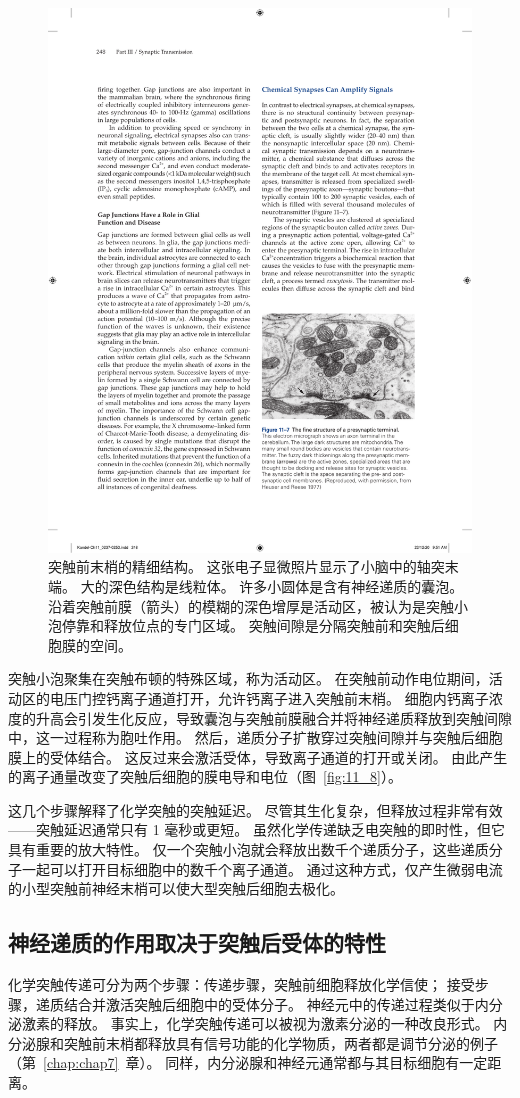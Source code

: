 \begin{figure}[htbp]
	\centering
	\includegraphics[width=0.5\linewidth]{chap11/fig_11_7}
	\caption{突触前末梢的精细结构。
		这张电子显微照片显示了小脑中的轴突末端。
		大的深色结构是线粒体。
		许多小圆体是含有神经递质的囊泡。
		沿着突触前膜（箭头）的模糊的深色增厚是活动区，被认为是突触小泡停靠和释放位点的专门区域。
		突触间隙是分隔突触前和突触后细胞膜的空间。}
	\label{fig:11_7}
\end{figure}


突触小泡聚集在突触布顿的特殊区域，称为活动区。
在突触前动作电位期间，活动区的电压门控钙离子通道打开，允许钙离子进入突触前末梢。
细胞内钙离子浓度的升高会引发生化反应，导致囊泡与突触前膜融合并将神经递质释放到突触间隙中，这一过程称为胞吐作用。
然后，递质分子扩散穿过突触间隙并与突触后细胞膜上的受体结合。
这反过来会激活受体，导致离子通道的打开或关闭。
由此产生的离子通量改变了突触后细胞的膜电导和电位（图~\ref{fig:11_8}）。


这几个步骤解释了化学突触的突触延迟。
尽管其生化复杂，但释放过程非常有效——突触延迟通常只有 1 毫秒或更短。
虽然化学传递缺乏电突触的即时性，但它具有重要的放大特性。
仅一个突触小泡就会释放出数千个递质分子，这些递质分子一起可以打开目标细胞中的数千个离子通道。
通过这种方式，仅产生微弱电流的小型突触前神经末梢可以使大型突触后细胞去极化。



\subsection{神经递质的作用取决于突触后受体的特性}

化学突触传递可分为两个步骤：传递步骤，突触前细胞释放化学信使；
接受步骤，递质结合并激活突触后细胞中的受体分子。
神经元中的传递过程类似于内分泌激素的释放。
事实上，化学突触传递可以被视为激素分泌的一种改良形式。
内分泌腺和突触前末梢都释放具有信号功能的化学物质，两者都是调节分泌的例子（第~\ref{chap:chap7}~章）。
同样，内分泌腺和神经元通常都与其目标细胞有一定距离。


